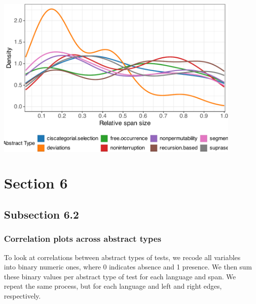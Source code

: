 \documentclass[
]{article}
\begin{document}
\begin{center}\includegraphics[width=0.9\textwidth,height=\textheight]{02_analyses_chapter17_files/figure-latex/density plot-1} \end{center}

\section{Section 6}\label{section-6}

\subsection{Subsection 6.2}\label{subsection-6.2}

\subsubsection{Correlation plots across abstract
types}\label{correlation-plots-across-abstract-types}

To look at correlations between abstract types of tests, we recode all
variables into binary numeric ones, where 0 indicates absence and 1
presence. We then sum these binary values per abstract type of test for
each language and span. We repeat the same process, but for each
language and left and right edges, respectively.
\end{document}
